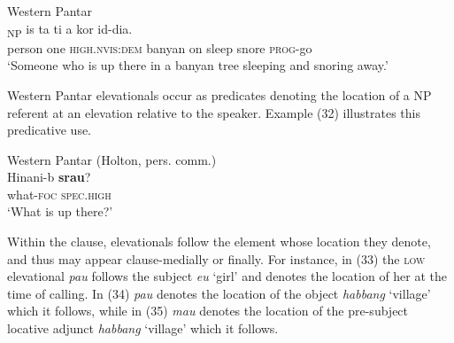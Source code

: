 \ea%
\label{ex:31}
    Western Pantar \citep{Holton2011}  \\
\textsubscript{NP} is   ta {{\ng}} ti {{\textglotstop}}{a}{{\ng}} kor  {id-dia.}\\
    person  one  \textsc{high.}\textsc{nvis:dem} banyan  on  sleep  snore  \textsc{prog}{}-go\\
\glt `Someone who is up there in a banyan tree sleeping and snoring away.'
\z






Western Pantar elevationals occur as predicates denoting the location of a NP referent at an elevation relative to the speaker. Example (32) illustrates this predicative use.



\ea%
\label{ex:32}
    Western Pantar (Holton, pers. comm.)   \\
\gll  Hinani-b  \textbf{{srau}}{?} \\
   what-\textsc{foc} \textsc {spec.high}  \\
\glt `What is up there?'
\z







Within the clause, elevationals follow the element whose location they denote, and thus may appear clause-medially or finally. For instance, in (33) the \textsc{low} elevational \textit{pau} follows the subject \textit{eu} `girl' and denotes the location of her at the time of calling. In (34) \textit{pau} denotes the location of the object \textit{habbang} `village' which it follows, while in (35) \textit{mau} denotes the location of the pre-subject locative adjunct \textit{habbang} `village' which it follows.




